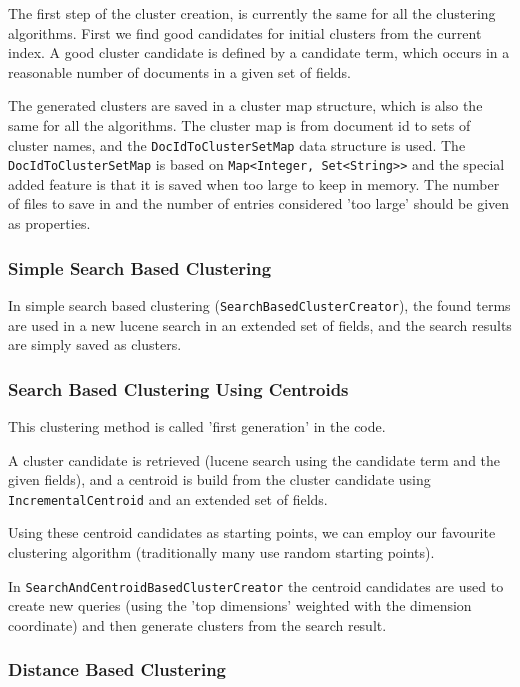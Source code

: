 \documentclass[a4paper,12pt]{article}
\begin{document}
The first step of the cluster creation, is currently the same for all
the clustering algorithms. First we find good candidates for initial
clusters from the current index. A good cluster candidate is defined
by a candidate term, which occurs in a reasonable number of documents
in a given set of fields.

The generated clusters are saved in a cluster map structure, which is
also the same for all the algorithms. The cluster map is from document
id to sets of cluster names, and the \texttt{DocIdToClusterSetMap}
data structure is used. The \texttt{DocIdToClusterSetMap} is based on
\texttt{Map<Integer, Set<String>>} and the special added feature is
that it is saved when too large to keep in memory. The number of files
to save in and the number of entries considered 'too large' should be
given as properties.

\subsubsection{Simple Search Based Clustering}

In simple search based clustering
(\texttt{SearchBasedClusterCreator}), the found terms are used in a
new lucene search in an extended set of fields, and the search results
are simply saved as clusters.

\subsubsection{Search Based Clustering Using Centroids}

This clustering method is called 'first generation' in the code.

A cluster candidate is retrieved (lucene search using the candidate
term and the given fields), and a centroid is build from the cluster
candidate using \texttt{IncrementalCentroid} and an extended set of
fields.

Using these centroid candidates as starting points, we can
employ our favourite clustering algorithm (traditionally many use
random starting points).

In \texttt{SearchAndCentroidBasedClusterCreator} the centroid
candidates are used to create new queries (using the 'top dimensions'
weighted with the dimension coordinate) and then generate clusters
from the search result.

\subsubsection{Distance Based Clustering}
\end{document}
